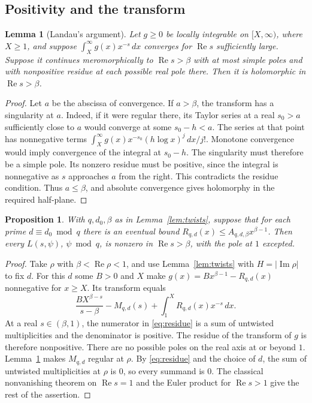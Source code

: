 \documentclass[11pt,reqno]{amsart}
\newtheorem{proposition}[theorem]{Proposition}
\newtheorem{lemma}[theorem]{Lemma}
\theoremstyle{definition}
\numberwithin{equation}{section}
\newcommand{\re}{\operatorname{Re}}
\newcommand{\im}{\operatorname{Im}}
\begin{document}
\subsection{Positivity and the transform}

\begin{lemma}[Landau's argument]\label{lem:landau}
Let \(g\ge0\) be locally integrable on \([X,\infty)\), where \(X\ge1\),
and suppose \(\int_X^\infty g(x)x^{-s}\,dx\) converges for
\(\re s\) sufficiently large. Suppose it continues meromorphically
to \(\re s>\beta\) with at most simple poles and with nonpositive
residue at each possible real pole there. Then it is holomorphic in
\(\re s>\beta\).
\end{lemma}

\begin{proof}
Let \(a\) be the abscissa of convergence. If \(a>\beta\), the transform has
a singularity at \(a\). Indeed, if it were regular there, its Taylor
series at a real \(s_0>a\) sufficiently close to \(a\) would converge at
some \(s_0-h<a\). The series at that point has nonnegative terms
\(\int_X^\infty g(x)x^{-s_0}(h\log x)^j\,dx/j!\). Monotone convergence
would imply convergence of the integral at \(s_0-h\). The singularity
must therefore be a simple pole. Its nonzero residue must be positive,
since the integral is nonnegative as \(s\) approaches \(a\) from the
right. This contradicts the residue condition. Thus \(a\le\beta\),
and absolute convergence gives holomorphy in the required half-plane.
\end{proof}

\begin{proposition}\label{prop:criterion}
With \(q,d_0,\beta\) as in Lemma~\ref{lem:twists}, suppose that for each
prime \(d\equiv d_0\bmod q\) there is an eventual bound
\(R_{q,d}(x)\le A_{q,d,\beta}x^{\beta-1}\).
Then every \(L(s,\psi)\), \(\psi\bmod q\), is nonzero in
\(\re s>\beta\), with the pole at \(1\) excepted.
\end{proposition}

\begin{proof}
Take \(\rho\) with \(\beta<\re\rho<1\), and use Lemma~\ref{lem:twists}
with \(H=|\im\rho|\) to fix \(d\). For this \(d\) some \(B>0\) and \(X\)
make \(g(x)=B x^{\beta-1}-R_{q,d}(x)\) nonnegative for \(x\ge X\).
Its transform equals
\[
 \frac{B X^{\beta-s}}{s-\beta}-M_{q,d}(s)
       +\int_1^X R_{q,d}(x)x^{-s}\,dx .
\]
At a real \(s\in(\beta,1)\), the numerator in \eqref{eq:residue} is
a sum of untwisted multiplicities and the denominator is positive.
The residue of the transform of \(g\) is therefore nonpositive.
There are no possible poles on the real axis at or beyond \(1\).
Lemma~\ref{lem:landau} makes \(M_{q,d}\) regular at \(\rho\).
By \eqref{eq:residue} and the choice of \(d\), the sum of untwisted
multiplicities at \(\rho\) is \(0\), so every summand is \(0\).
The classical nonvanishing theorem on \(\re s=1\) and the Euler product
for \(\re s>1\) give the rest of the assertion.
\end{proof}
\end{document}
